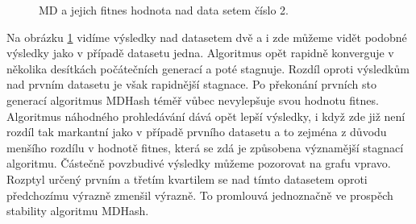 \begin{figure}[!ht]
	\centering
	\caption{MD a jejich fitnes hodnota nad data setem číslo 2.}
	\label{fig:MDComparison2}
\end{figure}

Na obrázku \ref{fig:MDComparison2} vidíme výsledky nad datasetem dvě a i zde můžeme vidět podobné výsledky jako v případě datasetu
jedna. Algoritmus opět rapidně konverguje v několika desítkách počátečních generací a poté stagnuje. Rozdíl oproti výsledkům nad prvním
datasetu je však rapidnější stagnace. Po překonání prvních sto generací algoritmus MDHash téměř vůbec nevylepšuje svou hodnotu fitnes.
Algoritmus náhodného prohledávání dává opět lepší výsledky, i když zde již není rozdíl tak markantní jako v případě prvního datasetu a to 
zejména z důvodu menšího rozdílu v hodnotě fitnes, která se zdá je způsobena významější stagnací algoritmu. Částečně povzbudivé výsledky
můžeme pozorovat na grafu vpravo. Rozptyl určený prvním a třetím kvartilem se nad tímto datasetem oproti předchozímu výrazně zmenšil
výrazně. To promlouvá jednoznačně ve prospěch stability algoritmu MDHash.

